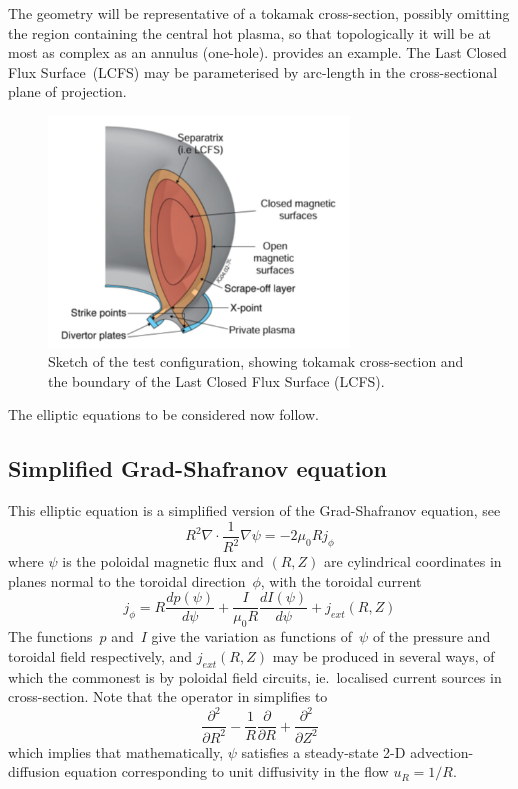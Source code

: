 The geometry will be representative of a tokamak cross-section, possibly
omitting
the region containing the central hot plasma, so that topologically it
will be at most as complex as an annulus (one-hole). 
provides an example. 
The Last Closed Flux Surface~(LCFS) may be parameterised by arc-length
in the cross-sectional plane of projection.

\begin{figure}
\centerline{
\includegraphics[width=8.0cm]{../png/xsect.png}
}
\caption{Sketch of the test configuration, showing tokamak cross-section
and the boundary of the Last Closed Flux Surface (LCFS).
\label{fig:xsect}}
\end{figure}

The elliptic equations to be considered now follow.

\subsection{Simplified Grad-Shafranov equation} \label{sec:GSimp}
This elliptic equation is a simplified version
of the Grad-Shafranov equation, see \cite{Ap18Equi}
\begin{equation}\label{eq:gs}
R^2 \nabla \cdot \frac{1}{R^2} \nabla \psi = -2 \mu_0 R j_{\phi}
\end{equation}
where $\psi$ is the poloidal magnetic flux and $(R,Z)$ are cylindrical coordinates
in planes normal to the toroidal direction~$\phi$, with the toroidal current
\begin{equation}\label{eq:jphi}
j_\phi= R \frac{dp(\psi)}{d\psi}+ \frac{I}{\mu_0 R} \frac{dI(\psi)}{d\psi} + j_{ext}(R,Z)
\end{equation}
The functions~$p$ and~$I$ give the variation as functions of~$\psi$
of the pressure and toroidal field respectively, and $j_{ext}(R,Z)$
may be produced in several ways, of which the commonest is by
poloidal field circuits, ie.\ localised current sources in cross-section.
Note that the operator in  simplifies to
\begin{equation}\label{eq:gsimp}
\frac{\partial^2}{\partial R^2} - \frac{1}{R}  \frac{\partial}{\partial R} + \frac{\partial^2}{\partial Z^2}
\end{equation}
which implies that mathematically, $\psi$ satisfies a steady-state 2-D advection-diffusion
equation corresponding to unit diffusivity in the flow $u_R=1/R$.

